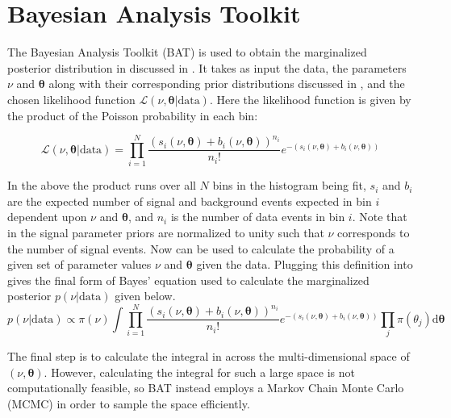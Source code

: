 \section{Bayesian Analysis Toolkit} \label{sec:fit:bat}

The Bayesian Analysis Toolkit (BAT) \cite{Beaujean:2011zz,Beresford:2642397} is
used to obtain the marginalized posterior distribution in 
discussed in .  It takes as input the data, the parameters
$\nu$ and $\boldsymbol{\theta}$ along with their corresponding prior
distributions discussed in , and the chosen likelihood
function $\mathcal{L}(\nu,\boldsymbol{\theta}|\text{data})$.  Here the
likelihood function is given by the product of the Poisson probability in each
bin: 

\begin{equation} \label{sec:fit:likelihood}
\mathcal{L}(\nu,\boldsymbol{\theta}|\text{data}) = \prod_{i=1}^{N} \frac{(s_{i}(\nu,\boldsymbol{\theta}) + b_{i}(\nu,\boldsymbol{\theta}))^{n_{i}}}{n_{i}!} e^{-(s_{i}(\nu,\boldsymbol{\theta}) + b_{i}(\nu,\boldsymbol{\theta}))}
\end{equation}

In the above the product runs over all $N$ bins in the histogram being fit,
$s_{i}$ and $b_{i}$ are the expected number of signal and background events
expected in bin $i$ dependent upon $\nu$ and $\boldsymbol{\theta}$, and $n_{i}$
is the number of data events in bin $i$.  Note that in 
the signal parameter priors are normalized to unity such that $\nu$ corresponds
to the number of signal events. Now  can be used to
calculate the probability of a given set of parameter values $\nu$ and
$\boldsymbol{\theta}$ given the data.  Plugging this definition into
 gives the final form of Bayes' equation used to
calculate the marginalized posterior $p(\nu|\text{data})$ given below.
%
\begin{equation} \label{sec:fit:full_bayes}
p(\nu|\text{data}) \propto \pi(\nu) \int \prod_{i=1}^{N} \frac{(s_{i}(\nu,\boldsymbol{\theta}) + b_{i}(\nu,\boldsymbol{\theta}))^{n_{i}}}{n_{i}!} e^{-(s_{i}(\nu,\boldsymbol{\theta}) + b_{i}(\nu,\boldsymbol{\theta}))} \prod_{j}\pi(\theta_j)\text{d}\boldsymbol{\theta}
\end{equation}

The final step is to calculate the integral in  across
the multi-dimensional space of $(\nu,\boldsymbol{\theta})$. However, calculating the
integral for such a large space is not computationally feasible, so BAT instead
employs a Markov Chain Monte Carlo (MCMC) \cite{2017arXiv170102434B,
Beresford:2642397} in order to sample the space efficiently.

